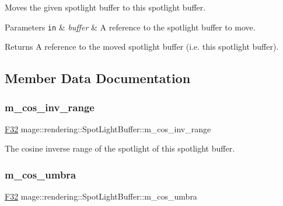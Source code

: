 Moves the given spotlight buffer to this spotlight buffer.


\begin{DoxyParams}[1]{Parameters}
\mbox{\tt in}  & {\em buffer} & A reference to the spotlight buffer to move. \\
\hline
\end{DoxyParams}
\begin{DoxyReturn}{Returns}
A reference to the moved spotlight buffer (i.\+e. this spotlight buffer). 
\end{DoxyReturn}


\subsection{Member Data Documentation}
\mbox{\label{structmage_1_1rendering_1_1_spot_light_buffer_a80c169b3f3e87c7d91a7b2b4473e4136}} 
\subsubsection{\texorpdfstring{m\+\_\+cos\+\_\+inv\+\_\+range}{m\_cos\_inv\_range}}
{\footnotesize\ttfamily \mbox{\hyperlink{namespacemage_aa97e833b45f06d60a0a9c4fc22ae02c0}{F32}} mage\+::rendering\+::\+Spot\+Light\+Buffer\+::m\+\_\+cos\+\_\+inv\+\_\+range}

The cosine inverse range of the spotlight of this spotlight buffer. \mbox{\label{structmage_1_1rendering_1_1_spot_light_buffer_afa3c23903a4b31bf6b7da537d7f9b660}} 
\subsubsection{\texorpdfstring{m\+\_\+cos\+\_\+umbra}{m\_cos\_umbra}}
{\footnotesize\ttfamily \mbox{\hyperlink{namespacemage_aa97e833b45f06d60a0a9c4fc22ae02c0}{F32}} mage\+::rendering\+::\+Spot\+Light\+Buffer\+::m\+\_\+cos\+\_\+umbra}

